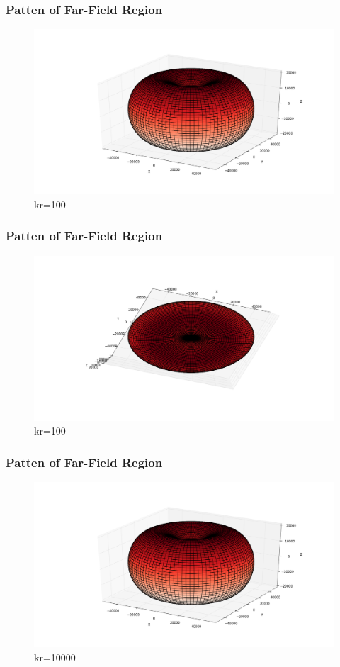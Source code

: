 \documentclass[compress=true]{beamer}
\begin{document}
\begin{frame}
  \frametitle{Patten of Far-Field Region}
  \begin{figure}
    \includegraphics[height=0.68\textheight]{far_kr_100_1.png}
    \caption*{\tiny{kr=100}}
  \end{figure}
\end{frame}
\begin{frame}
  \frametitle{Patten of Far-Field Region}
  \begin{figure}
    \includegraphics[height=0.68\textheight]{far_kr_100_2.png}
    \caption*{\tiny{kr=100}}
  \end{figure}
\end{frame}
\begin{frame}
  \frametitle{Patten of Far-Field Region}
  \begin{figure}
    \includegraphics[height=0.68\textheight]{far_kr_10000_1.png}
    \caption*{\tiny{kr=10000}}
  \end{figure}
\end{frame}
\end{document}

